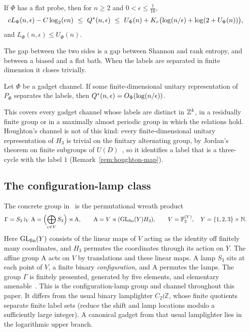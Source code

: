 \begin{corollary}\label{cor:sandwich}
If $\Phi$ has a flat probe, then for $n\ge2$ and $0<\epsilon\le\frac1{16}$,
\[
c L_\Phi(n,\epsilon)-C\log_2(en)\ \le\ \Qs(n,\epsilon)\ \le\ U_\Phi(n)+K_r\bigl(\log(n/\epsilon)+\log(2+U_\Phi(n))\bigr),
\]
and $L_\Phi(n,\epsilon)\le U_\Phi(n)$.
\end{corollary}

The gap between the two sides is a gap between Shannon and rank entropy, and between a biased and a flat bath. When the labels are separated
in finite dimension it closes trivially.

\begin{corollary}\label{cor:map}
Let $\Phi$ be a gadget channel. If some finite-dimensional unitary representation of $P_\Phi$ separates the labels, then
$Q^{*}(n,\epsilon)=O_\Phi(\log(n/\epsilon))$.
\end{corollary}

This covers every gadget channel whose labels are distinct in $\mathbb Z^k$, in a residually finite group or in a maximally almost periodic group in
which the relations hold. Houghton's channel is not of this kind: every finite-dimensional unitary representation of $H_3$ is trivial on the
finitary alternating group, by Jordan's theorem on finite subgroups of $U(D)$~\cite{Jordan1878}, so it identifies a label that is a
three-cycle with the label $1$ (Remark~\ref{rem:houghton-map}).

\subsection{The configuration-lamp class}

The concrete group in~\cite[Section~3]{DouglasMghirbiC} is the
permutational wreath product
\[
 \Gamma=S_3\wr_V\mathrm{A}=\Bigl(\bigoplus_{v\in V}S_3\Bigr)\rtimes\mathrm{A},\qquad
 \mathrm{A}=V\rtimes(\mathrm{GL}_{\rm fin}(Y)H_3),\qquad
 V=\mathbb F_2^{(Y)},\quad Y=\{1,2,3\}\times\mathbb N .
\]
Here $\mathrm{GL}_{\rm fin}(Y)$ consists of the linear maps of $V$ acting
as the identity off finitely many coordinates, and $H_3$ permutes the
coordinates through its action on $Y$. The affine group $\mathrm{A}$
acts on $V$ by translations and these linear maps. A lamp $S_3$ sits at
each point of $V$, a finite binary \emph{configuration}, and
$\mathrm{A}$ permutes the lamps. The group $\Gamma$ is finitely
presented, generated by five elements, and elementary
amenable~\cite[Theorem~A]{DouglasMghirbiC}. This is the
configuration-lamp group and channel throughout this paper. It differs from the usual
binary lamplighter $C_2\wr\mathbb Z$, whose finite quotients
separate finite label sets (reduce the shift and lamp locations
modulo a sufficiently large integer). A canonical gadget from
that usual lamplighter lies in the logarithmic upper branch.

